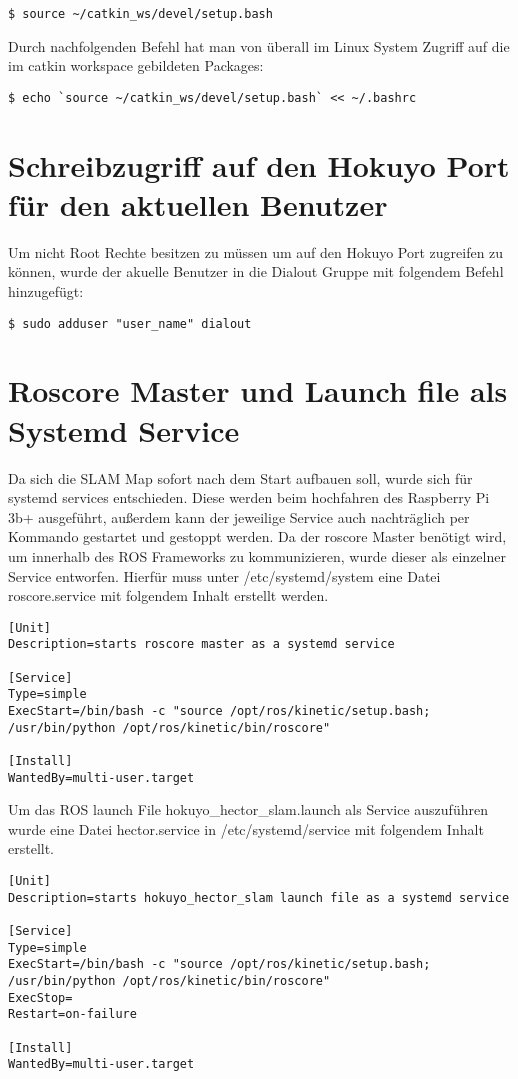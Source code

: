 \begin{lstlisting}
$ source ~/catkin_ws/devel/setup.bash
\end{lstlisting}

Durch nachfolgenden Befehl hat man von überall im Linux System Zugriff auf die im catkin workspace gebildeten Packages:\\ 

\begin{lstlisting}
$ echo `source ~/catkin_ws/devel/setup.bash` << ~/.bashrc
\end{lstlisting}

\section{Schreibzugriff auf den Hokuyo Port für den aktuellen Benutzer}
Um nicht Root Rechte besitzen zu müssen um auf den Hokuyo Port zugreifen zu können, wurde der akuelle Benutzer in die Dialout Gruppe mit folgendem Befehl hinzugefügt:\\

\begin{lstlisting}
$ sudo adduser "user_name" dialout
\end{lstlisting}

\section{Roscore Master und Launch file als Systemd Service}
Da sich die SLAM Map sofort nach dem Start aufbauen soll, wurde sich für systemd services entschieden. Diese werden beim hochfahren des Raspberry Pi 3b+ ausgeführt, außerdem kann der jeweilige Service auch nachträglich per Kommando gestartet und gestoppt werden. 
Da der roscore Master benötigt wird, um innerhalb des ROS Frameworks zu kommunizieren, wurde dieser als einzelner Service entworfen. Hierfür muss unter /etc/systemd/system eine Datei roscore.service mit folgendem Inhalt erstellt werden.\\


\begin{lstlisting}
[Unit]
Description=starts roscore master as a systemd service

[Service]
Type=simple
ExecStart=/bin/bash -c "source /opt/ros/kinetic/setup.bash; /usr/bin/python /opt/ros/kinetic/bin/roscore"

[Install]
WantedBy=multi-user.target
\end{lstlisting}

Um das ROS launch File hokuyo\_hector\_slam.launch als Service auszuführen wurde eine Datei hector.service in /etc/systemd/service mit folgendem Inhalt erstellt.\\

\begin{lstlisting}
[Unit]
Description=starts hokuyo_hector_slam launch file as a systemd service

[Service]
Type=simple
ExecStart=/bin/bash -c "source /opt/ros/kinetic/setup.bash; /usr/bin/python /opt/ros/kinetic/bin/roscore"
ExecStop=
Restart=on-failure

[Install]
WantedBy=multi-user.target
\end{lstlisting}

